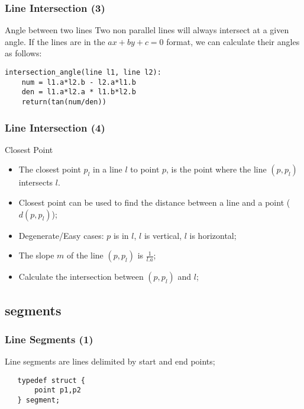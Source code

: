 \documentclass{beamer}
\begin{document}
\begin{frame}
  \frametitle{Line Intersection (3)}
  \begin{block}{Angle between two lines}
    Two non parallel lines will always intersect at a given angle. If
    the lines are in the $ax+by+c=0$ format, we can calculate their
    angles as follows:
  \end{block}
\begin{verbatim}
intersection_angle(line l1, line l2):
    num = l1.a*l2.b - l2.a*l1.b
    den = l1.a*l2.a * l1.b*l2.b
    return(tan(num/den))
\end{verbatim}
\end{frame}

\begin{frame}
  \frametitle{Line Intersection (4)}
  \begin{block}{Closest Point}
    {\small
    \begin{itemize}
      \item The closest point $p_l$ in a line $l$ to point $p$, is the point
        where the line $(p,p_l)$ intersects $l$.
      \item Closest point can be used to find the distance between a
        line and a point ($d(p,p_l)$);
    \end{itemize}
    }
  \end{block}
  \begin{itemize}
  \item Degenerate/Easy cases: $p$ is in $l$, $l$ is vertical, $l$ is horizontal;
  \item The slope $m$ of the line $(p,p_l)$ is $\frac{1}{l.a}$;
  \item Calculate the intersection between $(p,p_l)$ and $l$;
  \end{itemize}
\end{frame}


\subsection{segments}
\begin{frame}
  \frametitle{Line Segments (1)}
  \begin{block}{}
    Line segments are lines delimited by start and end points;
  \end{block}

\begin{verbatim}
   typedef struct {
       point p1,p2
   } segment;
\end{verbatim}
\bigskip

\end{frame}
\end{document}
